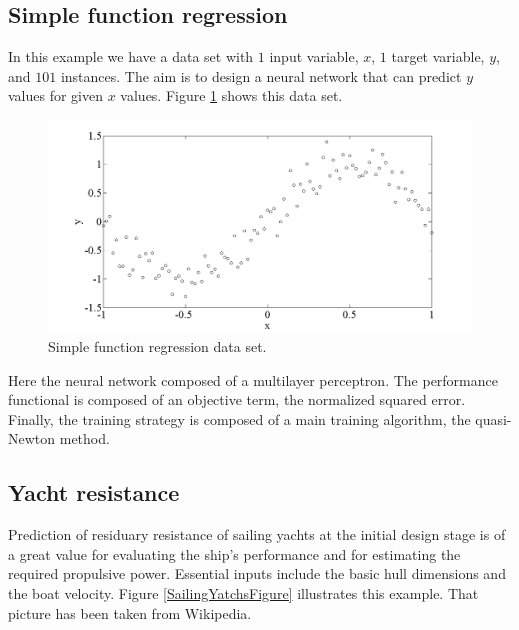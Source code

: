 \subsection*{Simple function regression}

In this example we have a data set with $1$ input variable, $x$, $1$ target variable, $y$, and $101$ instances. 
The aim is to design a neural network that can predict $y$ values for given $x$ values. 
Figure \ref{SimpleFunctionRegressionDataSet} shows this data set.

\begin{figure}[!hbp]
\begin{center}
\includegraphics[width=1.0\textwidth]{function_regression/simple_function_regression_data_set.png}
\caption{Simple function regression data set.}\label{SimpleFunctionRegressionDataSet}
\end{center}
\end{figure}

Here the neural network composed of a multilayer perceptron. 
The performance functional is composed of an objective term, the normalized squared error. 
Finally, the training strategy is composed of a main training algorithm, the quasi-Newton method. 

\subsection*{Yacht resistance}

Prediction of residuary resistance of sailing yachts at the
initial design stage is of a great value for evaluating the ship's
performance and for estimating the required propulsive power.
Essential inputs include the basic hull dimensions and the boat
velocity. 
Figure \ref{SailingYatchsFigure} illustrates this example. 
That picture has been taken from Wikipedia. 

